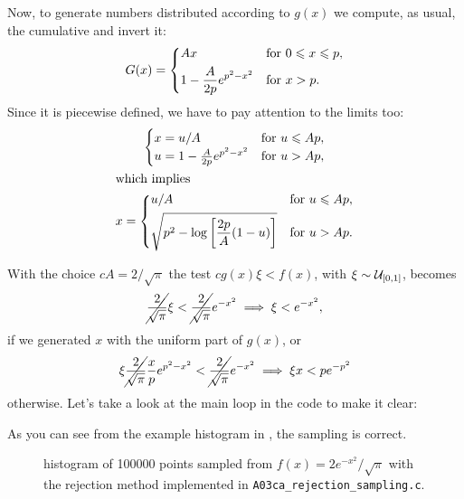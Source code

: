 \documentclass{gulartcl}
\begin{document}
Now, to generate numbers distributed according to $g(x)$ we compute, as usual,
the cumulative and invert it: 
\begin{equation}
    G(x) =
    \begin{dcases}
        Ax & \text{for } 0 \leq x \leq p, \\
        1 - \frac{A}{2p} e^{p^{2} - x^{2}} & \text{for } x > p.
    \end{dcases}
\end{equation}
Since it is piecewise defined, we have to pay attention to the limits too:
\begin{gather}
    \begin{cases}
        x = u / A & \text{for } u \leq Ap, \\
        u = 1 - \frac{A}{2p} e^{p^{2} - x^{2}} & \text{for } u > Ap,
    \end{cases} \\
\shortintertext{which implies}
    x = 
    \begin{dcases}
        u / A & \text{for } u \leq Ap, \\
        \sqrt{p^{2} - \log\left[\frac{2p}{A}(1 - u)\right]} & \text{for } u > Ap.
    \end{dcases}
\end{gather}

With the choice $cA = 2 / \sqrt{\pi}$ the test $c g(x) \xi < f(x)$, with $\xi
\sim \unif{0}{1}$, becomes
\begin{equation}
    \cancel{\frac{2}{\sqrt{\pi}}} \xi < \cancel{\frac{2}{\sqrt{\pi}}}
    e^{-x^{2}} \implies \xi < e^{-x^{2}},
\end{equation}
if we generated $x$ with the uniform part of $g(x)$, or
\begin{equation}
    \xi \cancel{\frac{2}{\sqrt{\pi}}} \frac{x}{p}e^{p^{2} - x^{2}} <
    \cancel{\frac{2}{\sqrt{\pi}}} e^{-x^{2}} \implies \xi x < p e^{-p^{2}}
\end{equation}
otherwise. Let’s take a look at the main loop in the code to make it clear:

As you can see from the example histogram in , the sampling is
correct.

\begin{figure}
    \centering
    
    \caption{histogram of \num{100000} points sampled from $f(x) = 2 e^{-x^{2}}
        / \sqrt{\pi}$ with the rejection method implemented in
        \texttt{A03ca\_rejection\_sampling.c}.}
    \label{fig:A03ca}
\end{figure}
\end{document}
